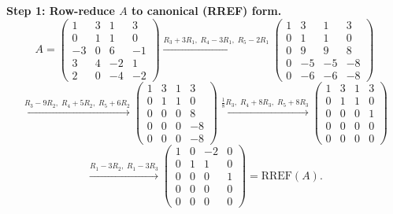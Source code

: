 \documentclass[12pt,a3paper]{article}
\begin{document}
\begin{tcolorbox}[enhanced,breakable,
  colback=cC!4,colframe=cC,boxrule=0.8pt,arc=5pt,
  title={\textbf{Answer --- Canonical Form, Row/Column Space, Rank \& Nullity}},
  fonttitle=\bfseries\color{white},colbacktitle=cC]

\textbf{Step 1: Row-reduce $A$ to canonical (RREF) form.}
\[
A = \begin{pmatrix}
 1 & 3 &  1 &  3 \\
 0 & 1 &  1 &  0 \\
-3 & 0 &  6 & -1 \\
 3 & 4 & -2 &  1 \\
 2 & 0 & -4 & -2
\end{pmatrix}
\xrightarrow{R_3+3R_1,\;R_4-3R_1,\;R_5-2R_1}
\begin{pmatrix}
1 & 3 &  1 &  3 \\
0 & 1 &  1 &  0 \\
0 & 9 &  9 &  8 \\
0 &-5 & -5 & -8 \\
0 &-6 & -6 & -8
\end{pmatrix}
\]
\[
\xrightarrow{R_3-9R_2,\;R_4+5R_2,\;R_5+6R_2}
\begin{pmatrix}
1 & 3 & 1 &  3 \\
0 & 1 & 1 &  0 \\
0 & 0 & 0 &  8 \\
0 & 0 & 0 & -8 \\
0 & 0 & 0 & -8
\end{pmatrix}
\xrightarrow{\frac{1}{8}R_3,\;R_4+8R_3,\;R_5+8R_3}
\begin{pmatrix}
1 & 3 & 1 & 3 \\
0 & 1 & 1 & 0 \\
0 & 0 & 0 & 1 \\
0 & 0 & 0 & 0 \\
0 & 0 & 0 & 0
\end{pmatrix}
\]
\[
\xrightarrow{R_1-3R_2,\;R_1-3R_3}
\begin{pmatrix}
1 & 0 & -2 & 0 \\
0 & 1 &  1 & 0 \\
0 & 0 &  0 & 1 \\
0 & 0 &  0 & 0 \\
0 & 0 &  0 & 0
\end{pmatrix} = \text{RREF}(A).
\]


\end{tcolorbox}
\end{document}
